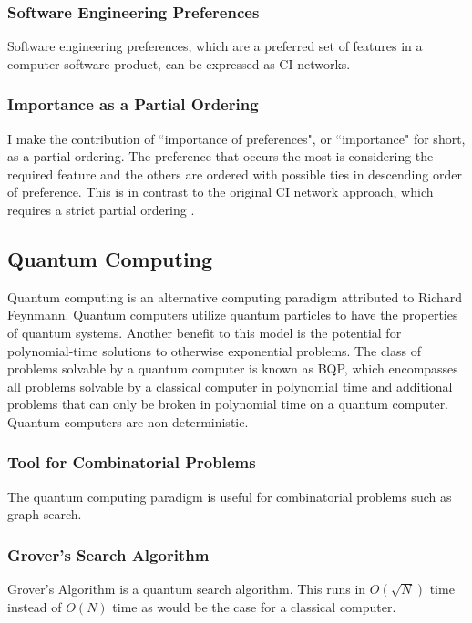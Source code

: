 \documentclass[12pt]{article}
\begin{document}
\begin{flushleft}
\subsubsection{Software Engineering Preferences}
Software engineering preferences, which are a preferred set of features in a computer software product, can be expressed as CI networks.

\subsubsection{Importance as a Partial Ordering}
I make the contribution of ``importance of preferences", or ``importance" for short, as a partial ordering. The preference that occurs the most is considering the required feature and the others are ordered with possible ties in descending order of preference. This is in contrast to the original CI network approach, which requires a strict partial ordering \cite{oster_scalable_2015}.

\subsection{Quantum Computing}
Quantum computing is an alternative computing paradigm attributed to Richard Feynmann. Quantum computers utilize quantum particles to have the properties of quantum systems. Another benefit to this model is the potential for polynomial-time solutions to otherwise exponential problems. The class of problems solvable by a quantum computer is known as BQP, which encompasses all problems solvable by a classical computer in polynomial time and additional problems that can only be broken in polynomial time on a quantum computer. Quantum computers are non-deterministic.
\subsubsection{Tool for Combinatorial Problems}
The quantum computing paradigm is useful for combinatorial problems such as graph search.
\subsubsection{Grover's Search Algorithm}
Grover's Algorithm is a quantum search algorithm. This runs in $O(\sqrt{N})$ time instead of $O(N)$ time as would be the case for a classical computer.


\end{flushleft}
\end{document}
